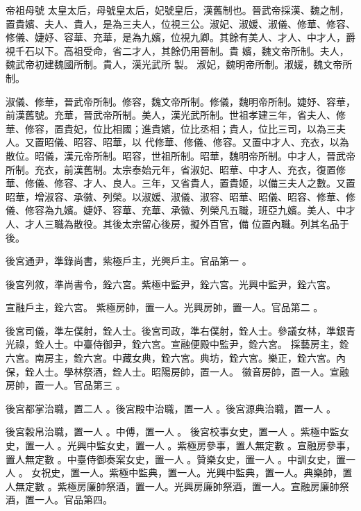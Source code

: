 
\begin{pinyinscope}

 帝祖母號
 太皇太后，母號皇太后，妃號皇后，漢舊制也。晉武帝採漢、魏之制，置貴嬪、夫人、貴人，是為三夫人，位視三公。淑妃、淑媛、淑儀、修華、修容、修儀、婕妤、容華、充華，是為九嬪，位視九卿。其餘有美人、才人、中才人，爵視千石以下。高祖受命，省二才人，其餘仍用晉制。貴
 嬪，魏文帝所制。夫人，魏武帝初建魏國所制。貴人，漢光武所
 製。
 淑妃，魏明帝所制。淑媛，魏文帝所制。



 淑儀、修華，晉武帝所制。修容，魏文帝所制。修儀，魏明帝所制。婕妤、容華，前漢舊號。充華，晉武帝所制。美人，漢光武所制。世祖孝建三年，省夫人、修華、修容，置貴妃，位比相國；進貴嬪，位比丞相；貴人，位比三司，以為三夫人。又置昭儀、昭容、昭華，以
 代修華、修儀、修容。又置中才人、充衣，以為散位。昭儀，漢元帝所制。昭容，世祖所制。昭華，魏明帝所制。中才人，晉武帝所制。充衣，前漢舊制。太宗泰始元年，省淑妃、昭華、中才人、充衣，復置修華、修儀、修容、才人、良人。三年，又省貴人，置貴姬，以備三夫人之數。又置昭華，增淑容、承徽、列榮。以淑媛、淑儀、淑容、昭華、昭儀、昭容、修華、修儀、修容為九嬪。婕妤、容華、充華、承徽、列榮凡五職，班亞九嬪。美人、中才人、才人三職為散役。其後太宗留心後房，擬外百官，備
 位置內職。列其名品于後。


後宮通尹，準錄尚書，紫極戶主，光興戶主。官品第一
 。



 後宮列敘，準尚書令，銓六宮。紫極中監尹，銓六宮。光興中監尹，銓六宮。


宣融戶主，銓六宮。
 紫極房帥，置一人。光興房帥，置一人。官品第二
 。


後宮司儀，準左僕射，銓人士。後宮司政，準右僕射，銓人士。參議女林，準銀青光祿，銓人士。中臺侍御尹，銓六宮。宣融便殿中監尹，銓六宮。
 採藝房主，銓六宮。南房主，銓六宮。中藏女典，銓六宮。典坊，銓六宮。樂正，銓六宮。內保，銓人士。學林祭酒，銓人士。昭陽房帥，置一人。
 徽音房帥，置一人。宣融房帥，置一人。官品第三
 。


後宮都掌治職，置二人
 。後宮殿中治職，置一人
 。後宮源典治職，置一人
 。


後宮穀帛治職，置一人
 。中傅，置一人
 。
 後宮校事女史，置一人
 。紫極中監女史，置一人
 。光興中監女史，置一人
 。紫極房參事，置人無定數
 。宣融房參事，置人無定數
 。中臺侍御奏案女史，置一人
 。贊樂女史，置一人
 。中訓女史，置一人
 。
 女祝史，置一人。紫極中監典，置一人。光興中監典，置一人。典樂帥，置人無定數
 。紫極房廉帥祭酒，置一人。光興房廉帥祭酒，置一人。宣融房廉帥祭酒，置一人。官品第四。



\end{pinyinscope}
